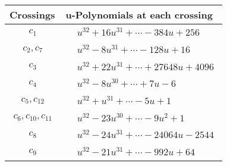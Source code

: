 \documentclass[1p]{elsarticle_modified}
\theoremstyle{definition}
\begin{document}
\begin{tabular}{m{50pt}|m{274pt}}
Crossings & \hspace{64pt}u-Polynomials at each crossing \\
\hline $$\begin{aligned}c_{1}\end{aligned}$$&$\begin{aligned}
&u^{32}+16 u^{31}+\cdots-384 u+256
\end{aligned}$\\
\hline $$\begin{aligned}c_{2},c_{7}\end{aligned}$$&$\begin{aligned}
&u^{32}-8 u^{31}+\cdots-128 u+16
\end{aligned}$\\
\hline $$\begin{aligned}c_{3}\end{aligned}$$&$\begin{aligned}
&u^{32}+22 u^{31}+\cdots+27648 u+4096
\end{aligned}$\\
\hline $$\begin{aligned}c_{4}\end{aligned}$$&$\begin{aligned}
&u^{32}-8 u^{30}+\cdots+7 u-6
\end{aligned}$\\
\hline $$\begin{aligned}c_{5},c_{12}\end{aligned}$$&$\begin{aligned}
&u^{32}+u^{31}+\cdots-5 u+1
\end{aligned}$\\
\hline $$\begin{aligned}c_{6},c_{10},c_{11}\end{aligned}$$&$\begin{aligned}
&u^{32}-23 u^{30}+\cdots-9 u^2+1
\end{aligned}$\\
\hline $$\begin{aligned}c_{8}\end{aligned}$$&$\begin{aligned}
&u^{32}-24 u^{31}+\cdots-24064 u-2544
\end{aligned}$\\
\hline $$\begin{aligned}c_{9}\end{aligned}$$&$\begin{aligned}
&u^{32}-21 u^{31}+\cdots-992 u+64
\end{aligned}$\\
\hline
\end{tabular}\\~\\
\end{document}
